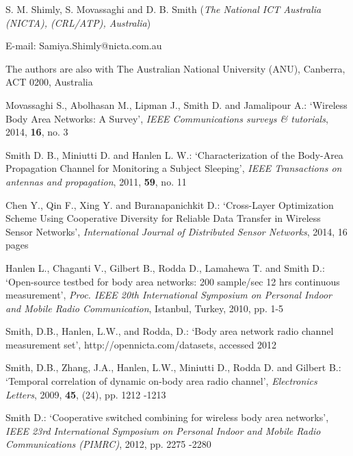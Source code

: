 \documentclass[twocolumn]{el-author}
\begin{document}
\vskip3pt

\vskip5pt

\noindent S. M. Shimly, S. Movassaghi and D. B. Smith (\textit{The National ICT Australia (NICTA), (CRL/ATP), Australia})
\vskip3pt

\noindent E-mail: Samiya.Shimly@nicta.com.au
\vskip3pt

\noindent The authors are also with The Australian National University (ANU), Canberra, ACT 0200, Australia

\begin{thebibliography}{}

Movassaghi S., Abolhasan M., Lipman J., Smith D. and Jamalipour A.: `Wireless Body Area Networks: A Survey', \textit{IEEE Communications surveys \& tutorials}, 2014, \textbf{16}, no. 3

Smith D. B., Miniutti D. and Hanlen L. W.: `Characterization of the Body-Area Propagation Channel for Monitoring a Subject Sleeping', \textit{IEEE Transactions on antennas and propagation}, 2011, \textbf{59}, no. 11

Chen Y., Qin F., Xing Y. and Buranapanichkit D.: `Cross-Layer Optimization Scheme Using Cooperative Diversity for Reliable Data Transfer in Wireless Sensor Networks', \textit{International Journal of Distributed Sensor Networks}, 2014, 16 pages

Hanlen L., Chaganti V., Gilbert B., Rodda D., Lamahewa T. and Smith D.: `Open-source testbed for body area networks: 200 sample/sec 12 hrs continuous measurement', \textit{Proc. IEEE 20th International Symposium on Personal Indoor and Mobile Radio Communication}, Istanbul, Turkey, 2010, pp. 1-5

Smith, D.B., Hanlen, L.W., and Rodda, D.: `Body area network radio channel measurement set', http://opennicta.com/datasets, accessed 2012

Smith, D.B., Zhang, J.A., Hanlen, L.W., Miniutti D., Rodda D. and Gilbert B.: `Temporal correlation of dynamic on-body area radio channel', \textit{Electronics Letters}, 2009, \textbf{45}, (24), pp. 1212 -1213

Smith D.: `Cooperative switched combining for wireless body area networks', \textit{IEEE 23rd International Symposium on Personal Indoor and Mobile Radio Communications (PIMRC)}, 2012, pp. 2275 -2280


\end{thebibliography}
\end{document}
